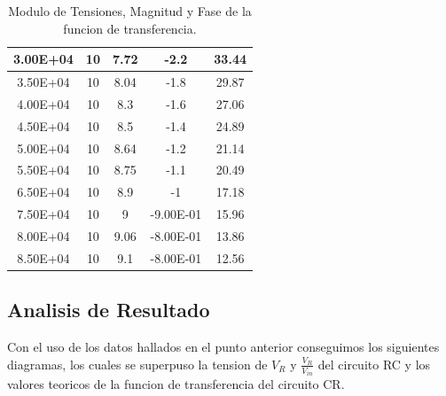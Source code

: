 \begin{table}[!htb]
\begin{tabular}{|c|c|c|c|c|}
3.00E+04  & 10    & 7.72     & -2.2            & 33.44         \\ \hline
3.50E+04  & 10    & 8.04     & -1.8            & 29.87         \\ \hline
4.00E+04  & 10    & 8.3      & -1.6            & 27.06         \\ \hline
4.50E+04  & 10    & 8.5      & -1.4            & 24.89         \\ \hline
5.00E+04  & 10    & 8.64     & -1.2            & 21.14         \\ \hline
5.50E+04  & 10    & 8.75     & -1.1            & 20.49         \\ \hline
6.50E+04  & 10    & 8.9      & -1              & 17.18         \\ \hline
7.50E+04  & 10    & 9        & -9.00E-01       & 15.96         \\ \hline
8.00E+04  & 10    & 9.06     & -8.00E-01       & 13.86         \\ \hline
8.50E+04  & 10    & 9.1      & -8.00E-01       & 12.56         \\ \hline
\end{tabular}
\caption{Modulo de Tensiones, Magnitud y Fase de la funcion de transferencia.}
\end{table}

\subsection{Analisis de Resultado}

Con el uso de los datos hallados en el punto anterior conseguimos los siguientes diagramas, los cuales se superpuso la tension de $V_R$ y $\frac{V_R}{V_{in}}$ del circuito RC y los valores teoricos de la funcion de transferencia del circuito CR. 

